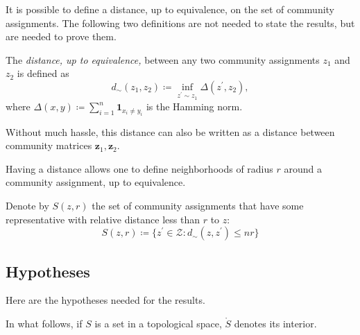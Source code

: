 \documentclass[../../main.tex]{subfiles} %
\begin{document}
It is possible to define a distance, up to equivalence, on the set of community 
assignments. The following two definitions are not needed to state the results, 
but are needed to prove them.

\begin{definition}
	The \textit{distance, up to equivalence,} between any two community 
	assignments 
	\(z_1\) and \(z_2\) is defined as
	\begin{equation}
		d_{\sim} (z_1, z_2) \coloneqq \inf_{z^\prime \sim z_1} \Delta (z^\prime, 
		z_2),
	\end{equation}
	where \(\Delta(x, y) \coloneqq \sum_{i=1}^n \mathbf{1}_{x_i \neq y_i}\) is 
	the Hamming norm.
\end{definition}
\begin{remark}
	Without much hassle, this distance can also be written as a distance between 
	community matrices \(\mathbf{z}_1, \mathbf{z}_2\).
\end{remark}

Having a distance allows one to define neighborhoods of radius \(r\) around a 
community assignment, up to equivalence.

\begin{definition}
	Denote by \(S(z, r)\) the set of community assignments that have some 
	representative with relative distance less than \(r\) to \(z\):
	\begin{equation}
		S(z, r) \coloneqq \{z^\prime \in \mathcal Z: d_{\sim}(z, z^\prime) 
		\leq n r\}
	\end{equation}
\end{definition}

\subsection{Hypotheses}

Here are the hypotheses needed for the results. 

\begin{notation}
	In what follows, if \(S\) is a set 
	in a topological space, \(\mathring{S}\) denotes its interior.
\end{notation}
\end{document}
